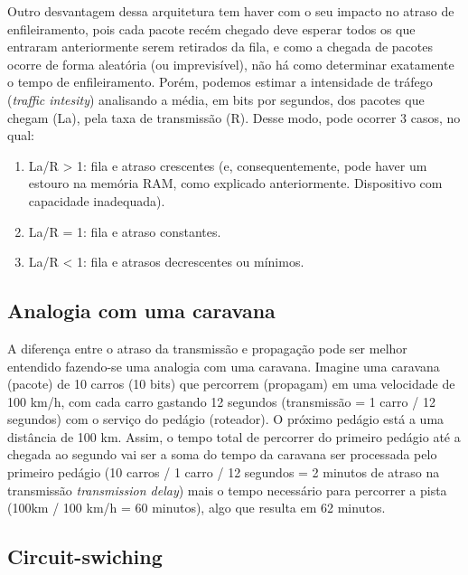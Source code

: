 Outro desvantagem dessa arquitetura tem haver com o seu impacto no
atraso de enfileiramento, pois cada pacote recém chegado deve esperar
todos os que entraram anteriormente serem retirados da fila, e como a
chegada de pacotes ocorre de forma aleatória (ou imprevisível), não há
como determinar exatamente o tempo de enfileiramento. Porém, podemos
estimar a intensidade de tráfego (\emph{traffic intesity}) analisando a
média, em bits por segundos, dos pacotes que chegam (La), pela taxa de
transmissão (R). Desse modo, pode ocorrer 3 casos, no qual:

\begin{enumerate}
\def\labelenumi{\arabic{enumi}.}
\tightlist
\item
  La/R \textgreater{} 1: fila e atraso crescentes (e, consequentemente,
  pode haver um estouro na memória RAM, como explicado anteriormente.
  Dispositivo com capacidade inadequada).
\item
  La/R = 1: fila e atraso constantes.
\item
  La/R \textless{} 1: fila e atrasos decrescentes ou mínimos.
\end{enumerate}

\hypertarget{analogia-com-uma-caravana}{%
\subsection{Analogia com uma caravana}\label{analogia-com-uma-caravana}}

A diferença entre o atraso da transmissão e propagação pode ser melhor
entendido fazendo-se uma analogia com uma caravana. Imagine uma caravana
(pacote) de 10 carros (10 bits) que percorrem (propagam) em uma
velocidade de 100 km/h, com cada carro gastando 12 segundos (transmissão
= 1 carro / 12 segundos) com o serviço do pedágio (roteador). O próximo
pedágio está a uma distância de 100 km. Assim, o tempo total de percorrer
do primeiro pedágio até a chegada ao segundo vai ser a soma do tempo da
caravana ser processada pelo primeiro pedágio (10 carros / 1 carro / 12
segundos = 2 minutos de atraso na transmissão \emph{transmission delay})
mais o tempo necessário para percorrer a pista (100km / 100 km/h = 60
minutos), algo que resulta em 62 minutos.

\hypertarget{circuit-swiching}{%
\subsection{Circuit-swiching}\label{circuit-swiching}}

